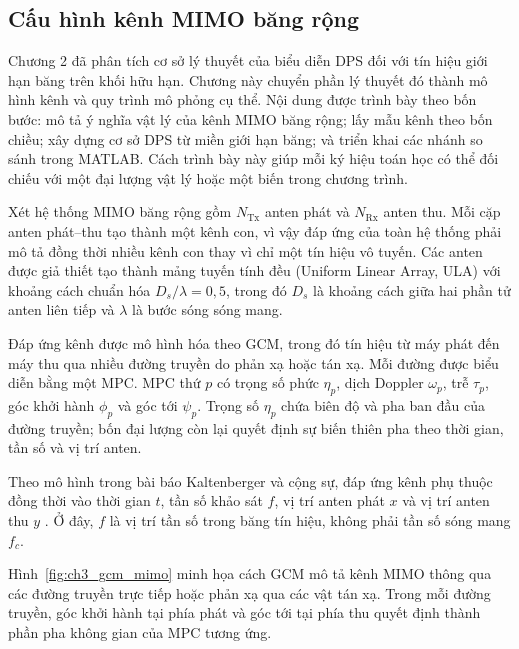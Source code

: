 \setcounter{section}{3}
\label{chap:system_simulation}

\subsection{Cấu hình kênh MIMO băng rộng}
\label{subsec:ch3_mimo_configuration}

Chương 2 đã phân tích cơ sở lý thuyết của biểu diễn DPS đối với tín hiệu giới hạn băng trên khối hữu hạn. Chương này chuyển phần lý thuyết đó thành mô hình kênh và quy trình mô phỏng cụ thể. Nội dung được trình bày theo bốn bước: mô tả ý nghĩa vật lý của kênh MIMO băng rộng; lấy mẫu kênh theo bốn chiều; xây dựng cơ sở DPS từ miền giới hạn băng; và triển khai các nhánh so sánh trong MATLAB. Cách trình bày này giúp mỗi ký hiệu toán học có thể đối chiếu với một đại lượng vật lý hoặc một biến trong chương trình.

Xét hệ thống MIMO băng rộng gồm \(N_{\mathrm{Tx}}\) anten phát và \(N_{\mathrm{Rx}}\) anten thu. Mỗi cặp anten phát--thu tạo thành một kênh con, vì vậy đáp ứng của toàn hệ thống phải mô tả đồng thời nhiều kênh con thay vì chỉ một tín hiệu vô tuyến. Các anten được giả thiết tạo thành mảng tuyến tính đều (Uniform Linear Array, ULA) với khoảng cách chuẩn hóa \(D_s/\lambda=0{,}5\), trong đó \(D_s\) là khoảng cách giữa hai phần tử anten liên tiếp và \(\lambda\) là bước sóng sóng mang.

Đáp ứng kênh được mô hình hóa theo GCM, trong đó tín hiệu từ máy phát đến máy thu qua nhiều đường truyền do phản xạ hoặc tán xạ. Mỗi đường được biểu diễn bằng một MPC. MPC thứ \(p\) có trọng số phức \(\eta_p\), dịch Doppler \(\omega_p\), trễ \(\tau_p\), góc khởi hành \(\phi_p\) và góc tới \(\psi_p\). Trọng số \(\eta_p\) chứa biên độ và pha ban đầu của đường truyền; bốn đại lượng còn lại quyết định sự biến thiên pha theo thời gian, tần số và vị trí anten.

Theo mô hình trong bài báo Kaltenberger và cộng sự, đáp ứng kênh phụ thuộc đồng thời vào thời gian \(t\), tần số khảo sát \(f\), vị trí anten phát \(x\) và vị trí anten thu \(y\) \cite{Kaltenberger2007}. Ở đây, \(f\) là vị trí tần số trong băng tín hiệu, không phải tần số sóng mang \(f_c\).

Hình~\ref{fig:ch3_gcm_mimo} minh họa cách GCM mô tả kênh MIMO thông qua các đường truyền trực tiếp hoặc phản xạ qua các vật tán xạ. Trong mỗi đường truyền, góc khởi hành tại phía phát và góc tới tại phía thu quyết định thành phần pha không gian của MPC tương ứng.

